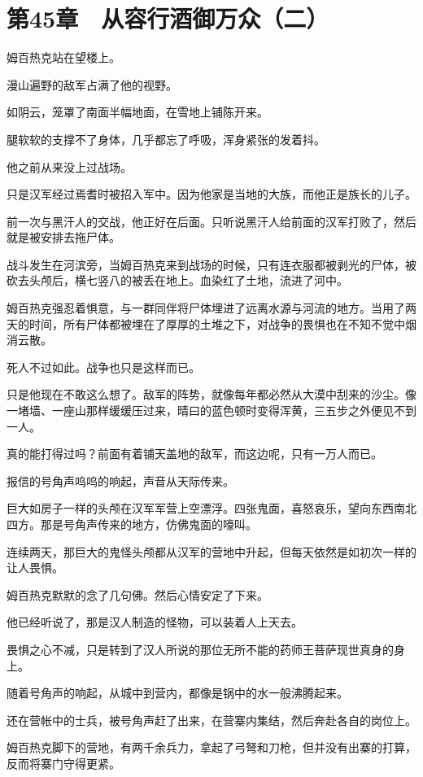 \section{第45章　从容行酒御万众（二）}

姆百热克站在望楼上。

漫山遍野的敌军占满了他的视野。

如阴云，笼罩了南面半幅地面，在雪地上铺陈开来。

腿软软的支撑不了身体，几乎都忘了呼吸，浑身紧张的发着抖。

他之前从来没上过战场。

只是汉军经过焉耆时被招入军中。因为他家是当地的大族，而他正是族长的儿子。

前一次与黑汗人的交战，他正好在后面。只听说黑汗人给前面的汉军打败了，然后就是被安排去拖尸体。

战斗发生在河滨旁，当姆百热克来到战场的时候，只有连衣服都被剥光的尸体，被砍去头颅后，横七竖八的被丢在地上。血染红了土地，流进了河中。

姆百热克强忍着惧意，与一群同伴将尸体埋进了远离水源与河流的地方。当用了两天的时间，所有尸体都被埋在了厚厚的土堆之下，对战争的畏惧也在不知不觉中烟消云散。

死人不过如此。战争也只是这样而已。

只是他现在不敢这么想了。敌军的阵势，就像每年都必然从大漠中刮来的沙尘。像一堵墙、一座山那样缓缓压过来，晴曰的蓝色顿时变得浑黄，三五步之外便见不到一人。

真的能打得过吗？前面有着铺天盖地的敌军，而这边呢，只有一万人而已。

报信的号角声呜呜的响起，声音从天际传来。

巨大如房子一样的头颅在汉军军营上空漂浮。四张鬼面，喜怒哀乐，望向东西南北四方。那是号角声传来的地方，仿佛鬼面的嚎叫。

连续两天，那巨大的鬼怪头颅都从汉军的营地中升起，但每天依然是如初次一样的让人畏惧。

姆百热克默默的念了几句佛。然后心情安定了下来。

他已经听说了，那是汉人制造的怪物，可以装着人上天去。

畏惧之心不减，只是转到了汉人所说的那位无所不能的药师王菩萨现世真身的身上。

随着号角声的响起，从城中到营内，都像是锅中的水一般沸腾起来。

还在营帐中的士兵，被号角声赶了出来，在营寨内集结，然后奔赴各自的岗位上。

姆百热克脚下的营地，有两千余兵力，拿起了弓弩和刀枪，但并没有出寨的打算，反而将寨门守得更紧。

